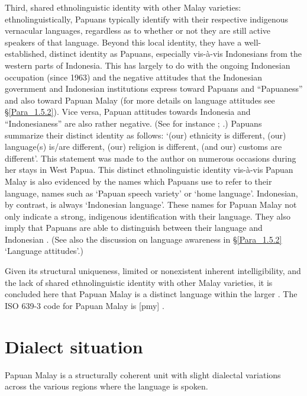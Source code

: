 Third, shared ethnolinguistic identity with other Malay varieties: ethnolinguistically, Papuans typically identify with their respective indigenous vernacular languages, regardless as to whether or not they are still active speakers of that language. Beyond this local identity, they have a well-established, distinct identity as Papuans, especially vis-à-vis Indonesians from the western parts of Indonesia. This has largely to do with the ongoing Indonesian occupation (since 1963) and the negative attitudes that the Indonesian government and Indonesian institutions express toward Papuans and  ``Papuaness'' and also toward Papuan Malay (for more details on language attitudes see §\ref{Para_1.5.2}). Vice versa, Papuan attitudes towards Indonesia and  ``Indonesianess'' are also rather negative. (See for instance \citealt{Chauvel.2002}; \citealt{King.2004}.) Papuans summarize their distinct identity as follows:  ‘(our) ethnicity is different, (our) language(s) is/are different, (our) religion is different, (and our) customs are different’. This statement was made to the author on numerous occasions during her stays in West Papua. This distinct ethnolinguistic identity vis-à-vis Papuan Malay is also evidenced by the names which Papuans use to refer to their language, names such as  ‘Papuan speech variety’ or  ‘home language’. Indonesian, by contrast, is always  ‘Indonesian language’. These names for Papuan Malay not only indicate a strong, indigenous identification with their language. They also imply that Papuans are able to distinguish between their language and Indonesian \citep[19]{Scott.2008}. (See also the discussion on language awareness in §\ref{Para_1.5.2} ‘Language attitudes’.)



Given its structural uniqueness, limited or nonexistent inherent intelligibility, and the lack of shared ethnolinguistic identity with other Malay varieties, it is concluded here that Papuan Malay is a distinct language within the larger . The ISO 639-3 code for Papuan Malay is [pmy] {\citep{Lewis.2016b}}.


\section{Dialect situation}\label{Para_1.3}
\largerpage
Papuan Malay is a structurally coherent unit with slight dialectal variations across the various regions where the language is spoken.



